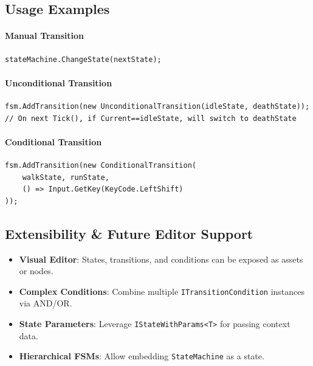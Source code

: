 \subsection{Usage Examples}

\paragraph{Manual Transition}
\begin{verbatim}
stateMachine.ChangeState(nextState);
\end{verbatim}

\paragraph{Unconditional Transition}
\begin{verbatim}
fsm.AddTransition(new UnconditionalTransition(idleState, deathState));
// On next Tick(), if Current==idleState, will switch to deathState
\end{verbatim}

\paragraph{Conditional Transition}
\begin{verbatim}
fsm.AddTransition(new ConditionalTransition(
    walkState, runState, 
    () => Input.GetKey(KeyCode.LeftShift)
));
\end{verbatim}

\subsection{Extensibility \& Future Editor Support}

\begin{itemize}
  \item \textbf{Visual Editor}: States, transitions, and conditions can be exposed as assets or nodes.
  \item \textbf{Complex Conditions}: Combine multiple \texttt{ITransitionCondition} instances via AND/OR.
  \item \textbf{State Parameters}: Leverage \texttt{IStateWithParams<T>} for passing context data.
  \item \textbf{Hierarchical FSMs}: Allow embedding \texttt{StateMachine} as a state.
\end{itemize}
